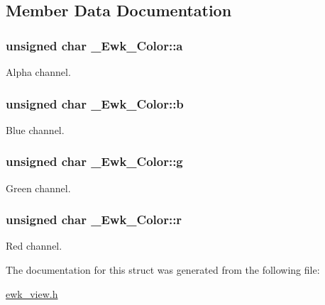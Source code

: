\subsection{Member Data Documentation}
\hypertarget{struct__Ewk__Color_ae672eb2b92a7976a263bc9f30b25cb05}{
\subsubsection[{a}]{\setlength{\rightskip}{0pt plus 5cm}unsigned char \+\_\+\+Ewk\+\_\+\+Color\+::a}}\label{struct__Ewk__Color_ae672eb2b92a7976a263bc9f30b25cb05}
Alpha channel. \hypertarget{struct__Ewk__Color_ac67063c69b5685a6ecd16f7221ddd91d}{
\subsubsection[{b}]{\setlength{\rightskip}{0pt plus 5cm}unsigned char \+\_\+\+Ewk\+\_\+\+Color\+::b}}\label{struct__Ewk__Color_ac67063c69b5685a6ecd16f7221ddd91d}
Blue channel. \hypertarget{struct__Ewk__Color_afe29ab27ad8ca26a5bf58636b474fb66}{
\subsubsection[{g}]{\setlength{\rightskip}{0pt plus 5cm}unsigned char \+\_\+\+Ewk\+\_\+\+Color\+::g}}\label{struct__Ewk__Color_afe29ab27ad8ca26a5bf58636b474fb66}
Green channel. \hypertarget{struct__Ewk__Color_a928e484dad75015395e12e7a14414771}{
\subsubsection[{r}]{\setlength{\rightskip}{0pt plus 5cm}unsigned char \+\_\+\+Ewk\+\_\+\+Color\+::r}}\label{struct__Ewk__Color_a928e484dad75015395e12e7a14414771}
Red channel. 

The documentation for this struct was generated from the following file\+:\begin{DoxyCompactItemize}
\item 
\hyperlink{ewk__view_8h}{ewk\+\_\+view.\+h}\end{DoxyCompactItemize}
